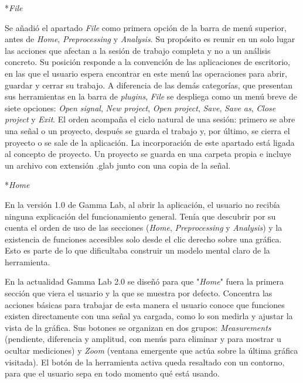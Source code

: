 \documentclass[12pt,letterpaper,oneside]{article}
\makeatletter
\newcommand{\subsubsubsection}[1]{%
  \@startsection{paragraph}{4}{\z@}{10pt plus 2pt minus 1pt}{4pt}%
    {\normalfont\normalsize\bfseries\itshape}*{#1}}
\makeatother
\begin{document}
\subsubsubsection{\textit{File}}

Se añadió el apartado \textit{File} como primera opción de la barra de menú superior, antes de \textit{Home}, \textit{Preprocessing} y \textit{Analysis}. Su propósito es reunir en un solo lugar las acciones que afectan a la sesión de trabajo completa y no a un análisis concreto. Su posición responde a la convención de las aplicaciones de escritorio, en las que el usuario espera encontrar en este menú las operaciones para abrir, guardar y cerrar su trabajo. A diferencia de las demás categorías, que presentan sus herramientas en la barra de \textit{plugins}, \textit{File} se despliega como un menú breve de siete opciones: \textit{Open signal}, \textit{New project}, \textit{Open project}, \textit{Save}, \textit{Save as}, \textit{Close project} y \textit{Exit}. El orden acompaña el ciclo natural de una sesión: primero se abre una señal o un proyecto, después se guarda el trabajo y, por último, se cierra el proyecto o se sale de la aplicación. La incorporación de este apartado está ligada al concepto de proyecto. Un proyecto se guarda en una carpeta propia e incluye un archivo con extensión .glab junto con una copia de la señal.

\subsubsubsection{\textit{Home}}

En la versión 1.0 de Gamma Lab, al abrir la aplicación, el usuario no recibía ninguna explicación del funcionamiento general. Tenía que descubrir por su cuenta el orden de uso de las secciones (\textit{Home}, \textit{Preprocessing} y \textit{Analysis}) y la existencia de funciones accesibles solo desde el clic derecho sobre una gráfica. Esto es parte de lo que dificultaba construir un modelo mental claro de la herramienta.

En la actualidad Gamma Lab 2.0 se diseñó para que "\textit{Home}" fuera la primera sección que viera el usuario y la que se muestra por defecto. Concentra las acciones básicas para trabajar de esta manera el usuario conoce que funciones existen directamente con una señal ya cargada, como lo son medirla y ajustar la vista de la gráfica. Sus botones se organizan en dos grupos: \textit{Measurements} (pendiente, diferencia y amplitud, con menús para eliminar y para mostrar u ocultar mediciones) y \textit{Zoom} (ventana emergente que actúa sobre la última gráfica visitada). El botón de la herramienta activa queda resaltado con un contorno, para que el usuario sepa en todo momento qué está usando.
\end{document}
